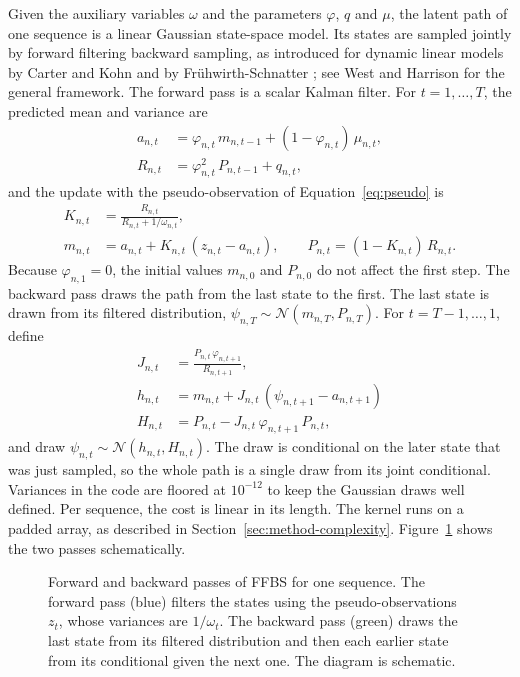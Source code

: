 Given the auxiliary variables $\omega$ and the parameters $\varphi$, $q$ and $\mu$, the latent
path of one sequence is a linear Gaussian state-space model. Its states are sampled jointly by
forward filtering backward sampling, as introduced for dynamic linear models by Carter and Kohn
\cite{carter1994gibbs} and by Fr\"uhwirth-Schnatter \cite{fruhwirth1994data}; see West and Harrison
\cite{west1997bayesian} for the general framework. The forward pass is a scalar Kalman filter. For
$t = 1, \dots, T$, the predicted mean and variance are
\begin{align}
  a_{n,t} &= \varphi_{n,t}\,m_{n,t-1} + (1-\varphi_{n,t})\,\mu_{n,t}, \label{eq:ffbs-a}\\
  R_{n,t} &= \varphi_{n,t}^2\,P_{n,t-1} + q_{n,t}, \label{eq:ffbs-R}
\end{align}
and the update with the pseudo-observation of Equation~\eqref{eq:pseudo} is
\begin{align}
  K_{n,t} &= \frac{R_{n,t}}{R_{n,t} + 1/\omega_{n,t}}, \label{eq:ffbs-K}\\
  m_{n,t} &= a_{n,t} + K_{n,t}\,(z_{n,t} - a_{n,t}), \qquad
  P_{n,t} = (1-K_{n,t})\,R_{n,t}. \label{eq:ffbs-m}
\end{align}
Because $\varphi_{n,1} = 0$, the initial values $m_{n,0}$ and $P_{n,0}$ do not affect the first
step. The backward pass draws the path from the last state to the first. The last state is drawn
from its filtered distribution, $\psi_{n,T} \sim \mathcal N(m_{n,T}, P_{n,T})$. For
$t = T-1, \dots, 1$, define
\begin{align}
  J_{n,t} &= \frac{P_{n,t}\,\varphi_{n,t+1}}{R_{n,t+1}}, \label{eq:ffbs-J}\\
  h_{n,t} &= m_{n,t} + J_{n,t}\,(\psi_{n,t+1} - a_{n,t+1}) \nonumber\\
  H_{n,t} &= P_{n,t} - J_{n,t}\,\varphi_{n,t+1}\,P_{n,t}, \label{eq:ffbs-H}
\end{align}
and draw $\psi_{n,t} \sim \mathcal N(h_{n,t}, H_{n,t})$. The draw is conditional on the later state
that was just sampled, so the whole path is a single draw from its joint conditional. Variances in
the code are floored at $10^{-12}$ to keep the Gaussian draws well defined. Per sequence, the cost is linear in its length. The kernel runs on a padded array, as described in Section~\ref{sec:method-complexity}. Figure~\ref{fig:tk_ffbs} shows the two passes schematically.

\begin{figure}[htbp]
  \centering
  
  \caption{Forward and backward passes of FFBS for one sequence. The forward pass (blue) filters the
    states using the pseudo-observations $z_t$, whose variances are $1/\omega_t$. The backward pass
    (green) draws the last state from its filtered distribution and then each earlier state from its
    conditional given the next one. The diagram is schematic.}
  \label{fig:tk_ffbs}
\end{figure}

